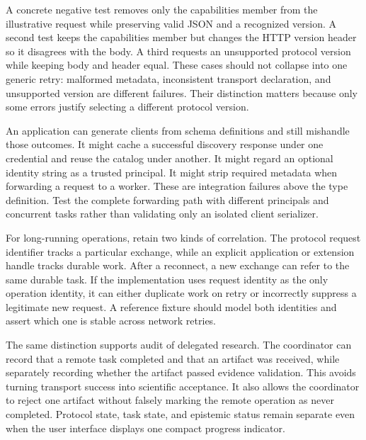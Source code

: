 A concrete negative test removes only the capabilities member from the illustrative request while preserving valid JSON and a recognized version. A second test keeps the capabilities member but changes the HTTP version header so it disagrees with the body. A third requests an unsupported protocol version while keeping body and header equal. These cases should not collapse into one generic retry: malformed metadata, inconsistent transport declaration, and unsupported version are different failures. Their distinction matters because only some errors justify selecting a different protocol version.

An application can generate clients from schema definitions and still mishandle those outcomes. It might cache a successful discovery response under one credential and reuse the catalog under another. It might regard an optional identity string as a trusted principal. It might strip required metadata when forwarding a request to a worker. These are integration failures above the type definition. Test the complete forwarding path with different principals and concurrent tasks rather than validating only an isolated client serializer.

For long-running operations, retain two kinds of correlation. The protocol request identifier tracks a particular exchange, while an explicit application or extension handle tracks durable work. After a reconnect, a new exchange can refer to the same durable task. If the implementation uses request identity as the only operation identity, it can either duplicate work on retry or incorrectly suppress a legitimate new request. A reference fixture should model both identities and assert which one is stable across network retries.

The same distinction supports audit of delegated research. The coordinator can record that a remote task completed and that an artifact was received, while separately recording whether the artifact passed evidence validation. This avoids turning transport success into scientific acceptance. It also allows the coordinator to reject one artifact without falsely marking the remote operation as never completed. Protocol state, task state, and epistemic status remain separate even when the user interface displays one compact progress indicator.

